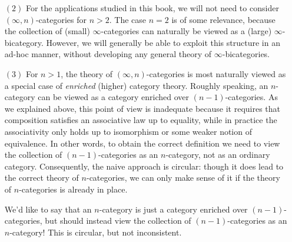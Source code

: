 \begin{1.1.1 Goals and Obstacles}
\begin{itemize}
\item[$(2)$] For the applications studied in this book, we will not need to consider $(\infty,n)$-categories for $n > 2$. The case $n=2$ is of some relevance, because the collection of (small) $\infty$-categories can naturally be viewed as a (large) $\infty$-bicategory. However, we will generally be able to exploit this structure in an ad-hoc manner, without developing any general theory of $\infty$-bicategories.

\item[$(3)$] For $n > 1$, the theory of $(\infty,n)$-categories is most naturally viewed as a special case of {\em enriched} (higher) category theory. Roughly speaking, an $n$-category can be viewed as a category enriched over $(n-1)$-categories. As we explained above, this point of view is inadequate because it requires that composition satisfies an associative law up to equality, while in practice the associativity only holds up to isomorphism or some weaker notion of equivalence.
In other words, to obtain the correct definition we need to view the collection of $(n-1)$-categories
as an $n$-category, not as an ordinary category. Consequently, the naive approach is circular:  though it does lead to the correct theory of $n$-categories, we can only make sense of it if the theory of $n$-categories is already in place.
\begin{shaded}
We'd like to say that an $n$-category is just a category enriched over $(n-1)$-categories, but should instead view the collection of $(n-1)$-categories as an $n$-category! This is circular, but not inconsistent.
\end{shaded}


\end{itemize}
\end{1.1.1 Goals and Obstacles}
